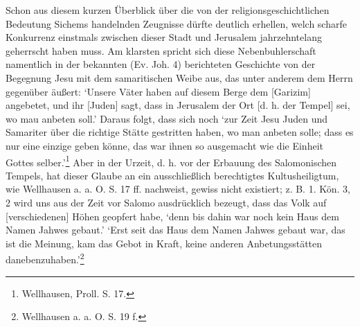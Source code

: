 \documentclass[a4paper, 11pt, oneside]{article}
\begin{document}
Schon aus diesem kurzen Überblick über die von der religionsgeschichtlichen Bedeutung Sichems handelnden Zeugnisse dürfte deutlich erhellen, welch scharfe Konkurrenz einstmals zwischen dieser Stadt und Jerusalem jahrzehntelang geherrscht haben muss. Am klarsten spricht sich diese Nebenbuhlerschaft namentlich in der bekannten (Ev. Joh. 4) berichteten Geschichte von der Begegnung Jesu mit dem samaritischen Weibe aus, das unter anderem dem Herrn gegenüber äußert: `Unsere Väter haben auf diesem Berge dem [Garizim] angebetet, und ihr [Juden] sagt, dass in Jerusalem der Ort [d. h. der Tempel] sei, wo mau anbeten soll.' Daraus folgt, dass sich noch `zur Zeit Jesu Juden und Samariter über die richtige Stätte gestritten haben, wo man anbeten solle; dass es nur eine einzige geben könne, das war ihnen so ausgemacht wie die Einheit Gottes selber.'\footnote{Wellhausen, Proll. S. 17.} Aber in der Urzeit, d. h. vor der Erbauung des Salomonischen Tempels, hat dieser Glaube an ein ausschließlich berechtigtes Kultusheiligtum, wie Wellhausen a. a. O. S. 17 ff. nachweist, gewiss nicht existiert; z. B. 1. Kön. 3, 2 wird uns aus der Zeit vor Salomo ausdrücklich bezeugt, dass das Volk auf [verschiedenen] Höhen geopfert habe, `denn bis dahin war noch kein Haus dem Namen Jahwes gebaut.' `Erst seit das Haus dem Namen Jahwes gebaut war, das ist die Meinung, kam das Gebot in Kraft, keine anderen Anbetungsstätten danebenzuhaben.'\footnote{Wellhausen a. a. O. S. 19 f.}
\end{document}
